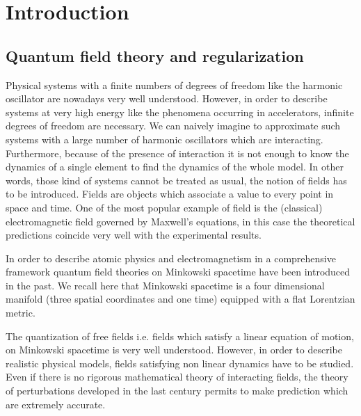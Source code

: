 \documentclass[11pt]{book}
\theoremstyle{break}
\begin{document}
\chapter*{Introduction}


\section*{Quantum field theory and regularization}


Physical systems with a finite numbers of degrees of freedom like the harmonic oscillator are nowadays very well understood. However, in order to describe systems at very high energy like the phenomena occurring in accelerators, infinite degrees of freedom are necessary. We can naively imagine to approximate such systems with a large number of harmonic oscillators which are interacting. Furthermore, because of the presence of interaction it is not enough to know the dynamics of a single element to find the dynamics of the whole model. In other words, those kind of systems cannot be treated as usual, the notion of fields has to be introduced. 
Fields are objects which associate a value to every point in space and time. One of the most popular example of field is the (classical) electromagnetic field governed by Maxwell’s equations, in this case the theoretical predictions coincide very well with the experimental results.\par%


In order to describe atomic physics and electromagnetism in a comprehensive framework quantum field theories on Minkowski spacetime have been introduced in the past. We recall here that Minkowski spacetime is a four dimensional manifold (three spatial coordinates and one time) equipped with a flat Lorentzian metric.\par%


The quantization of free fields i.e. fields which satisfy a linear equation of motion, on Minkowski spacetime is very well understood. However, in order to describe realistic physical models, fields satisfying non linear dynamics have to be studied. Even if there is no rigorous mathematical theory of interacting fields, the theory of perturbations developed in the last century permits to make prediction which are extremely accurate.\par%
\end{document}
